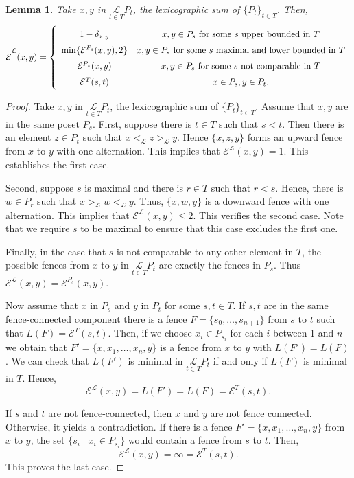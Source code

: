 \documentclass{article}[12pt]
\theoremstyle{exampstyle}
\newtheorem{lemma}[theorem]{Lemma}
\theoremstyle{remark}
\newcommand{\E}{\mathcal{E}}
\newcommand{\lex}[1][]{\underset{#1}{\mathcal{L}}}
\newcommand{\tuple}[3][1]{#2_{#1}, \dots , #2_{#3}}
\begin{document}
\begin{lemma}
    Take $x,y$ in $\lex[t \in T] P_t$, the lexicographic sum of $\{P_t\}_{t \in T}$. Then,
    \begin{equation*}
        \E^{\lex} (x,y) = \left\{ 
        \def\arraystretch{1.5}
        \begin{array}{cc}
            1 - \delta_{x,y} & x,y \in P_s \text{ for some } s \text{ upper bounded in } T \\ 
            \min\{\E^{P_s}(x,y) , 2 \} & x,y \in P_s \text{ for some } s \text{ maximal and lower bounded in } T \\
            \E^{P_s}(x,y) & x,y \in P_s \text{ for some } s \text{ not comparable in } T \\
            \E^{T}(s,t) &  x\in P_s , y \in P_t.
        \end{array}
        \right.
    \end{equation*}
\end{lemma}
\begin{proof}
    Take $x,y$ in $\lex[t \in T] P_t$, the lexicographic sum of $\{P_t\}_{t \in T}$. Assume that $x,y$ are in the same poset $P_s$. First, suppose there is $t \in T$ such that $s < t$. Then there is an element $z \in P_t$ such that $x <_{\lex} z >_{\lex} y$. Hence $\{ x,z,y\}$ forms an upward fence from $x$ to $y$ with one alternation. This implies that $\E^{\lex}(x,y) = 1$. This establishes the first case.
    
    Second, suppose $s$ is maximal and there is $r \in T$ such that $r<s$. Hence, there is $w \in P_r$ such that $x >_{\lex} w <_{\lex} y$. Thus, $\{ x,w,y\}$ is a downward fence with one alternation. This implies that $\E^{\lex}(x,y) \leq 2$. This verifies the second case. Note that we require $s$ to be maximal to ensure that this case excludes the first one.

    Finally, in the case that $s$ is not comparable to any other element in $T$, the possible fences from $x$ to $y$ in $\lex[t \in T] P_t$ are exactly the fences in $P_s$. Thus $\E^{\lex}(x,y) = \E^{P_s}(x,y)$.
    
    Now assume that  $x$ in $P_s$ and $y$ in $P_t$ for some $s,t \in T$. If $s,t$ are in the same fence-connected component there is a fence $F = \{\tuple[0]{s}{n+1}\}$ from $s$ to $t$ such that $L(F) = \E^T(s,t)$. Then, if we choose $x_i \in P_{s_i} $ for each $i$ between 1 and $n$ we obtain that $F' = \{x, \tuple{x}{n},y\}$ is a fence from $x$ to $y$ with $L(F') = L(F)$. We can check that $L(F')$ is minimal in $\lex[t \in T] P_t$ if and only if $L(F)$ is minimal in $T$.  Hence, 
    \[  \E^{\lex} (x,y) = L(F') = L(F) =  \E^T(s,t). \]
    
    If $s$ and $t$ are not fence-connected, then $x$ and $y$ are not fence connected. Otherwise, it yields a contradiction. If there is a fence $F' = \{x, \tuple{x}{n},y\}$ from $x$ to $y$, the set $\{ s_i \mid x_i \in P_{s_i}\} $ would contain a fence from $s$ to $t$. Then, \[\E^{\lex} (x,y) = \infty = \E^T(s,t). \]
    This proves the last case.   
\end{proof}
\end{document}
